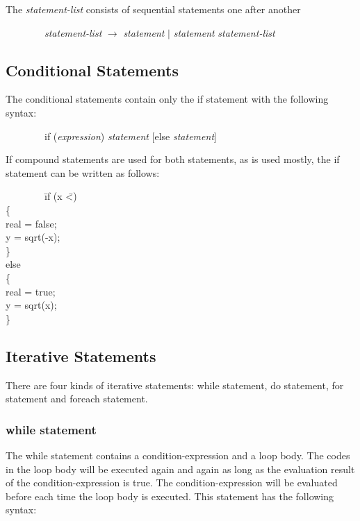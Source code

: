 \documentclass[12pt,psfig,a4]{article}
\begin{document}
The \textsl{statement-list} consists of sequential statements one after another

\begin{code}
\begin{tabbing}
~~~~~~~~\textsl{statement-list}  $\rightarrow$ \textsl{statement} $\mid$ \textsl{statement} \textsl{statement-list}
\end{tabbing}
\end{code}

\subsection{Conditional Statements}
The conditional statements contain only the if statement with the following syntax:

\begin{code}
\begin{tabbing}
~~~~~~~~if (\textsl{expression}) \textsl{statement} [else \textsl{statement}]
\end{tabbing}
\end{code}

If compound statements are used for both statements, as is used mostly, the if statement can be written as follows:

\begin{code}
\begin{tabbing}
~~~~~~~~\= if (x \= \textless {}) \\
\> \{ \\
\> \> real = false; \\
\> \> y = sqrt(-x); \\
\> \} \\
\> else \\
\> \{ \\
\> \> real = true; \\
\> \> y = sqrt(x); \\
\> \}
\end{tabbing}
\end{code}

\subsection{Iterative Statements}
There are four kinds of iterative statements: while statement, do statement, for statement and foreach statement.

\subsubsection{while statement}
The while statement contains a condition-expression and a loop body. The codes in the loop body will be executed again and again as long as the evaluation result of the condition-expression is true. The condition-expression will be evaluated before each time the loop body is executed. This statement has the following syntax:
\end{document}
